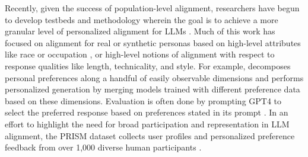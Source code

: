 Recently, given the success of population-level alignment, researchers have begun to develop testbeds and methodology wherein the goal is to achieve a more granular level of personalized alignment for LLMs \citep{castricato2024personareproducibletestbedpluralistic, jang2023personalizedsoupspersonalizedlarge, kirk2024prismalignmentprojectparticipatory, li2024personalizedlanguagemodelingpersonalized}.
Much of this work has focused on alignment for real or synthetic personas based on high-level attributes like race or occupation \citep{castricato2024personareproducibletestbedpluralistic, chan2024scalingsyntheticdatacreation}, or high-level notions of alignment with respect to response qualities like length, technicality, and style.  
For example, \citet{jang2023personalizedsoupspersonalizedlarge} decomposes personal preferences along a handful of easily observable dimensions and performs personalized generation by merging models trained with different preference data based on these dimensions.
Evaluation is often done by prompting GPT4 to select the preferred response based on preferences stated in its prompt \citep{jang2023personalizedsoupspersonalizedlarge, castricato2024personareproducibletestbedpluralistic}.  
In an effort to highlight the need for broad participation and representation in LLM alignment, the PRISM dataset collects user profiles and personalized preference feedback from over 1,000 diverse human participants \citep{kirk2024prismalignmentprojectparticipatory}.


